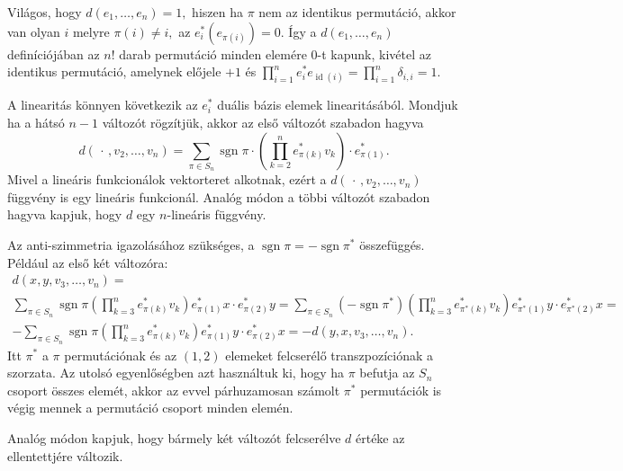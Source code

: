 \documentclass[a4paper, showtrims]{memoir}
\makeatletter
\renewenvironment{proof}[1][\proofname]
    {\par\pushQED{\qed}%
    \normalfont \topsep6\p@\@plus6\p@\relax
    \trivlist
    \item[\hskip\labelsep
        \itshape
    #1\@addpunct{:}]\ignorespaces}
    {\popQED\endtrivlist\@endpefalse}
\theoremstyle{plain}
\theoremstyle{remark}
\theoremstyle{definition}
\DeclareMathOperator{\sgn}{sgn}
\DeclareMathOperator{\id}{id}
\makeatother
\begin{document}
\begin{proof}
	Világos,
	hogy $d\left( e_{1},\ldots ,e_{n}\right) =1,$
	hiszen ha $\pi $ nem az identikus permutáció,
	akkor van olyan $i$ melyre $\pi \left( i\right) \neq i,$
	az $e_{i}^{\ast }\left( e_{\pi \left( i\right) }\right) =0$.
	Így a $d\left( e_1,\ldots,e_n \right)$ definíciójában az $n!$ darab permutáció minden elemére $0$-t
	kapunk, kivétel az identikus permutáció,
	amelynek előjele $+1$ és
	$
		\prod_{i=1}^ne_i^\ast e_{\id(i)}
		=
		\prod_{i=1}^n\delta_{i,i}=1.
	$

	A linearitás könnyen következik az $e_{i}^\ast$ duális bázis elemek linearitásából.
	Mondjuk ha a hátsó $n-1$ változót rögzítjük,
	akkor az első változót szabadon hagyva
	\[
		d\left(\,\cdot\,,v_{2},\ldots ,v_{n}\right)
		=
		\sum_{\pi\in S_{n}}\sgn\pi
		\cdot
		\left(\prod_{k=2}^ne_{\pi\left( k\right) }^\ast v_k\right)
		\cdot
		e_{\pi\left( 1\right)}^\ast.
	\]
	Mivel a lineáris funkcionálok vektorteret alkotnak,
	ezért a $d\left( \,\cdot\,,v_2,\ldots,v_n \right)$ függvény is egy lineáris funkcionál.
	Analóg módon a többi változót szabadon hagyva kapjuk, hogy $d$ egy $n$-lineáris függvény.

	Az anti-szimmetria igazolásához szükséges, a $\sgn\pi =-\sgn\pi^\ast$ összefüggés.
	Például az első két változóra:
	\begin{multline*}
		d\left( x,y,v_{3},\ldots ,v_{n}\right)
		=
		\\
		\sum_{\pi \in S_{n}}\sgn\pi \left( \prod_{k=3}^{n}e_{\pi \left( k\right) }^{\ast }v_{k}\right)
		e_{\pi \left( 1\right) }^\ast x
		\cdot
		e_{\pi \left( 2\right)}^\ast y
		=
		\sum_{\pi \in S_{n}}(-\sgn\pi^\ast)
		\left(\prod_{k=3}^{n}e_{\pi ^{\ast }\left( k\right) }^{\ast }v_{k}\right)
		e_{\pi^\ast\left( 1\right) }^{\ast } y
		\cdot
		e_{\pi^\ast\left(2\right) }^\ast x
		=
		\\
		-\sum_{\pi \in S_{n}}\operatorname{sgn}\pi \left( \prod_{k=3}^{n}e_{\pi \left( k\right) }^{\ast }v_{k}\right)
		e_{\pi \left( 1\right) }^{\ast }y
		\cdot
		e_{\pi \left( 2\right) }^{\ast } x
		=
		-d\left(y,x,v_{3},\ldots ,v_{n}\right) .
	\end{multline*}
	Itt $\pi^\ast$ a $\pi$ permutációnak és az $(1,2)$ elemeket felcserélő transzpozíciónak a szorzata.
	Az utolsó egyenlőségben azt használtuk ki,
	hogy ha $\pi$ befutja az $S_n$ csoport összes elemét,
	akkor az evvel párhuzamosan számolt $\pi^\ast$ permutációk is végig mennek a permutáció csoport minden elemén.

	Analóg módon kapjuk, hogy bármely két változót felcserélve $d$ értéke az ellentettjére változik.
\end{proof}
\end{document}
